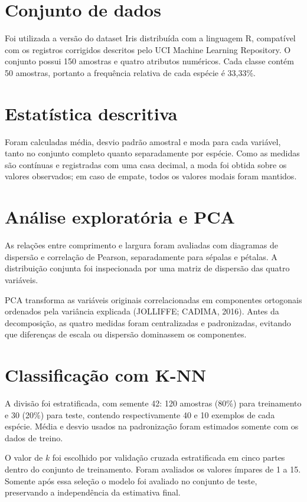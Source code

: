 \documentclass[12pt, a4paper, twoside, chapter=TITLE, subsection=TITLE,
section=TITLE, subsubsection=TITLE, english, brazil]{abntex2}
\begin{document}
\section{Conjunto de dados}
Foi utilizada a versão do dataset Iris distribuída com a linguagem R, compatível com os registros corrigidos descritos pelo UCI Machine Learning Repository. O conjunto possui 150 amostras e quatro atributos numéricos. Cada classe contém 50 amostras, portanto a frequência relativa de cada espécie é 33,33\%.

\section{Estatística descritiva}
Foram calculadas média, desvio padrão amostral e moda para cada variável, tanto no conjunto completo quanto separadamente por espécie. Como as medidas são contínuas e registradas com uma casa decimal, a moda foi obtida sobre os valores observados; em caso de empate, todos os valores modais foram mantidos.

\section{Análise exploratória e PCA}
As relações entre comprimento e largura foram avaliadas com diagramas de dispersão e correlação de Pearson, separadamente para sépalas e pétalas. A distribuição conjunta foi inspecionada por uma matriz de dispersão das quatro variáveis.

PCA transforma as variáveis originais correlacionadas em componentes ortogonais ordenados pela variância explicada (JOLLIFFE; CADIMA, 2016). Antes da decomposição, as quatro medidas foram centralizadas e padronizadas, evitando que diferenças de escala ou dispersão dominassem os componentes.

\section{Classificação com K-NN}
A divisão foi estratificada, com semente 42: 120 amostras (80\%) para treinamento e 30 (20\%) para teste, contendo respectivamente 40 e 10 exemplos de cada espécie. Média e desvio usados na padronização foram estimados somente com os dados de treino.

O valor de $k$ foi escolhido por validação cruzada estratificada em cinco partes dentro do conjunto de treinamento. Foram avaliados os valores ímpares de 1 a 15. Somente após essa seleção o modelo foi avaliado no conjunto de teste, preservando a independência da estimativa final.
\end{document}
